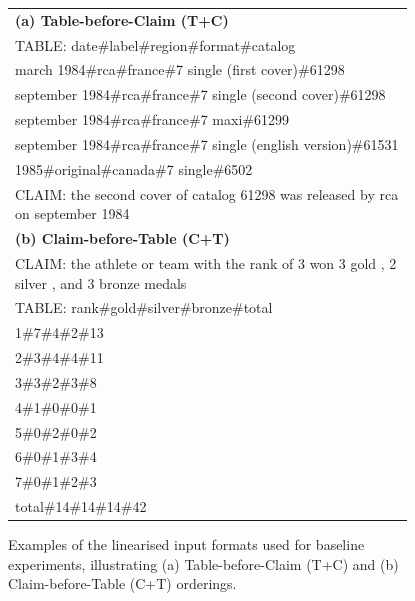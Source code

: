 \begin{figure}[htbp]
\centering
\small
\begin{tabular}{|p{0.94\linewidth}|}
\hline
\textbf{(a) Table-before-Claim (T+C)} \\
\ttfamily\footnotesize
TABLE: date\#label\#region\#format\#catalog \\
march 1984\#rca\#france\#7 single (first cover)\#61298 \\
september 1984\#rca\#france\#7 single (second cover)\#61298 \\
september 1984\#rca\#france\#7 maxi\#61299 \\
september 1984\#rca\#france\#7 single (english version)\#61531 \\
1985\#original\#canada\#7 single\#6502 \\
CLAIM: the second cover of catalog 61298 was released by rca on september 1984 \\
\hline
\textbf{(b) Claim-before-Table (C+T)} \\
\ttfamily\footnotesize
CLAIM: the athlete or team with the rank of 3 won 3 gold , 2 silver , and 3 bronze medals \\
TABLE: rank\#gold\#silver\#bronze\#total \\
1\#7\#4\#2\#13 \\
2\#3\#4\#4\#11 \\
3\#3\#2\#3\#8 \\
4\#1\#0\#0\#1 \\
5\#0\#2\#0\#2 \\
6\#0\#1\#3\#4 \\
7\#0\#1\#2\#3 \\
total\#14\#14\#14\#42 \\
\hline
\end{tabular}
\caption{Examples of the linearised input formats used for baseline experiments, illustrating (a) Table-before-Claim (T+C) and (b) Claim-before-Table (C+T) orderings.}
\label{fig:input-formats}
\end{figure}